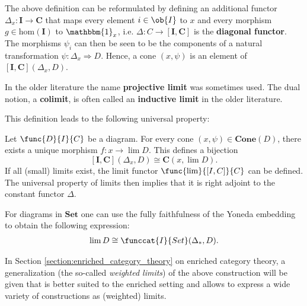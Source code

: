     \begin{adefinition}
        The above definition can be reformulated by defining an additional functor $\Delta_x:\mathbf{I}\rightarrow\mathbf{C}$ that maps every element $i\in\ob{I}$ to $x$ and every morphism $g\in\text{hom}(\mathbf{I})$ to $\mathbbm{1}_x$, i.e. $\Delta:C\rightarrow[\mathbf{I},\mathbf{C}]$ is the \textbf{diagonal functor}. The morphisms $\psi_i$ can then be seen to be the components of a natural transformation $\psi:\Delta_x\Rightarrow D$. Hence, a cone $(x,\psi)$ is an element of $[\mathbf{I},\mathbf{C}](\Delta_x,D)$.
    \end{adefinition}

    \begin{remark*}
        In the older literature the name \textbf{projective limit} was sometimes used. The dual notion, a \textbf{colimit}, is often called an \textbf{inductive limit} in the older literature.
    \end{remark*}
    This definition leads to the following universal property:
    \begin{uproperty}\label{cat:limit_uproperty}
        Let $\func{D}{I}{C}$ be a diagram. For every cone $(x,\psi)\in\mathbf{Cone}(D)$, there exists a unique morphism $f:x\rightarrow\lim D$. This defines a bijection \[[\mathbf{I}, \mathbf{C}](\Delta_x,D)\cong\mathbf{C}(x,\lim D).\]
        If all (small) limits exist, the limit functor $\func{\lim}{[I,C]}{C}$ can be defined. The universal property of limits then implies that it is right adjoint to the constant functor $\Delta$.

        For diagrams in $\mathbf{Set}$ one can use the fully faithfulness of the Yoneda embedding to obtain the following expression:
        \begin{gather}
            \lim D\cong\funccat{I}{Set}(\Delta_\ast,D).
        \end{gather}
    \end{uproperty}
    \begin{remark}
        In Section \ref{section:enriched_category_theory} on enriched category theory, a generalization (the so-called \textit{weighted limits}) of the above construction will be given that is better suited to the enriched setting and allows to express a wide variety of constructions as (weighted) limits.
    \end{remark}

